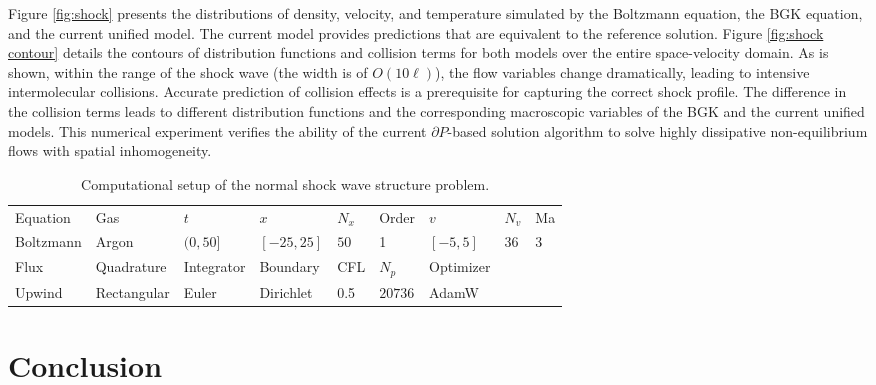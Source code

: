 \documentclass[preprint,3p,12pt,sort&compress]{elsarticle}
\begin{document}
Figure \ref{fig:shock} presents the distributions of density, velocity, and temperature simulated by the Boltzmann equation, the BGK equation, and the current unified model.
The current model provides predictions that are equivalent to the reference solution.
Figure \ref{fig:shock contour} details the contours of distribution functions and collision terms for both models over the entire space-velocity domain.
As is shown, within the range of the shock wave (the width is of $O(10\ell)$), the flow variables change dramatically, leading to intensive intermolecular collisions.
Accurate prediction of collision effects is a prerequisite for capturing the correct shock profile.
The difference in the collision terms leads to different distribution functions and the corresponding macroscopic variables of the BGK and the current unified models.
This numerical experiment verifies the ability of the current $\partial P$-based solution algorithm to solve highly dissipative non-equilibrium flows with spatial inhomogeneity.

\begin{table}[htbp]
    \caption{Computational setup of the normal shock wave structure problem.} 
    \centering
    \begin{tabular}{lllllllll} 
        \hline
        Equation & Gas & $t$ & $x$ & $N_{x}$ & Order & $v$ & $N_{v}$ & Ma \\ 
        Boltzmann & Argon & $(0,50]$ & $[-25,25]$ & $50$ & 1 & $[-5,5]$ & 36 & 3 \\ 
        \hline
        Flux & Quadrature & Integrator & Boundary & CFL & $N_{p}$ & Optimizer \\
        Upwind & Rectangular & Euler & Dirichlet & 0.5 & $20736$ & AdamW \\
        \hline
    \end{tabular} 
    \label{tab:shock}
\end{table}

\section{Conclusion}
\end{document}

